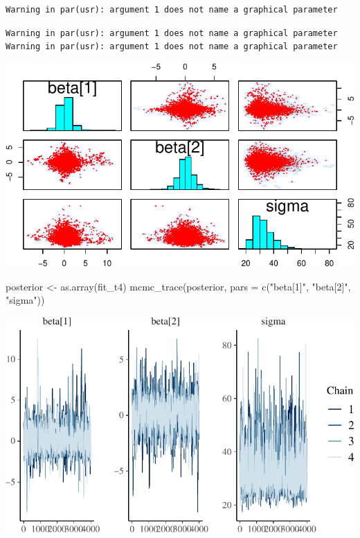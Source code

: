 \documentclass[
  10pt,
]{article}
\newenvironment{Shaded}{\begin{snugshade}}{\end{snugshade}}
\newcommand{\AttributeTok}[1]{\textcolor[rgb]{0.40,0.45,0.13}{#1}}
\newcommand{\FunctionTok}[1]{\textcolor[rgb]{0.28,0.35,0.67}{#1}}
\newcommand{\NormalTok}[1]{\textcolor[rgb]{0.00,0.23,0.31}{#1}}
\newcommand{\OtherTok}[1]{\textcolor[rgb]{0.00,0.23,0.31}{#1}}
\newcommand{\StringTok}[1]{\textcolor[rgb]{0.13,0.47,0.30}{#1}}
\begin{document}
\begin{verbatim}
Warning in par(usr): argument 1 does not name a graphical parameter
\end{verbatim}

\begin{verbatim}
Warning in par(usr): argument 1 does not name a graphical parameter
Warning in par(usr): argument 1 does not name a graphical parameter
\end{verbatim}

\includegraphics{551-HW-Q2_files/figure-pdf/unnamed-chunk-5-1.pdf}

\begin{Shaded}
\begin{Highlighting}[]
\NormalTok{posterior }\OtherTok{\textless{}{-}} \FunctionTok{as.array}\NormalTok{(fit\_t4)}
\FunctionTok{mcmc\_trace}\NormalTok{(posterior, }\AttributeTok{pars =} \FunctionTok{c}\NormalTok{(}\StringTok{"beta[1]"}\NormalTok{, }\StringTok{"beta[2]"}\NormalTok{, }\StringTok{"sigma"}\NormalTok{))}
\end{Highlighting}
\end{Shaded}

\includegraphics{551-HW-Q2_files/figure-pdf/unnamed-chunk-6-1.pdf}
\end{document}
